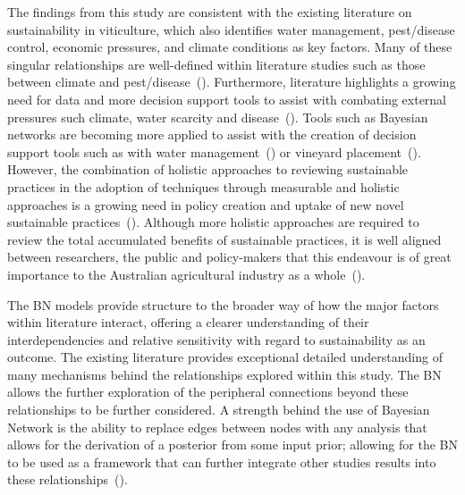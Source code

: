 \documentclass[fleqn,10pt]{wlscirep}
\begin{document}
The findings from this study are consistent with the existing literature on sustainability in viticulture, which also identifies water management, pest/disease control, economic pressures, and climate conditions as key factors. Many of these singular relationships are well-defined within literature studies such as those between climate and pest/disease~(\cite{olatinwoChapterWeatherbasedPest2014}). Furthermore, literature  highlights a growing need for data and more decision support tools to assist with combating external pressures such climate, water scarcity and disease~(\cite{naigeonDATADecisionmakingViticulture2023,stefaniniBayesianCausalModel2022,fincoCombiningPrecisionViticulture2022a,laurentLocalInfluenceClimate2022}). Tools such as Bayesian networks are becoming more applied to assist with the creation of decision support tools such as with water management~(\cite{carmonaUseParticipatoryObjectOriented2011}) or vineyard placement~(\cite{abbalDecisionSupportSystem2016}). However, the combination of holistic approaches to reviewing sustainable practices in the adoption of techniques through measurable and holistic approaches is a growing need in policy creation and uptake of new novel sustainable practices~(\cite{mayfieldDesigningExpertledBayesian2023,baianoOverviewSustainabilityWine2021,dichiaraCollaborativeApproachAchieving2024}). Although more holistic approaches are required to review the total accumulated benefits of sustainable practices, it is well aligned between researchers, the public and policy-makers that this endeavour is of great importance to the Australian agricultural industry as a whole~(\cite{dumbrellComparingAustralianPublic2024}).

The BN models provide structure to the broader way of how the major factors within literature interact, offering a clearer understanding of their interdependencies and relative sensitivity with regard to sustainability as an outcome. The existing literature provides exceptional detailed understanding of many mechanisms behind the relationships explored within this study. The BN allows the further exploration of the peripheral connections beyond these relationships to be further considered. A strength behind the use of Bayesian Network is the ability to replace edges between nodes with any analysis that allows for the derivation of a posterior from some input prior; allowing for the BN to be used as a framework that can further integrate other studies results into these relationships~(\cite{kimphuctranMachineLearningProbabilistic2022,kollerObjectOrientedBayesianNetworks1997,korbBayesianArtificialIntelligence2011}).
\end{document}
